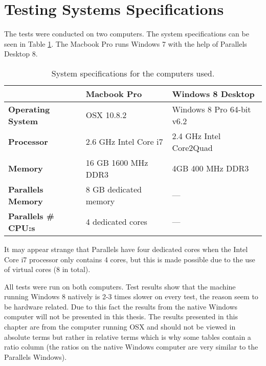 \section{Testing Systems Specifications}
The tests were conducted on two computers. The system specifications can be seen in Table \ref{table:system_specs}. The Macbook Pro runs Windows 7 with the help of Parallels Desktop 8. 

\begin{table}[h]
	\begin{center}
		\begin{tabular} { m{4cm} | m{4cm}  | m{5cm} }
			\hline
			\textbf{} & \textbf{Macbook Pro} & 
			\textbf{Windows 8 Desktop}  \\ \hline

			\textbf{Operating System}		& OSX 10.8.2 
											& Windows 8 Pro 64-bit v6.2 \\ \hline

			\textbf{Processor}				& 2.6 GHz Intel Core i7 
											& 2.4 GHz Intel Core2Quad  \\ \hline

			\textbf{Memory}					& 16 GB 1600 MHz DDR3
											& 4GB 400 MHz DDR3 \\ \hline

			\textbf{Parallels Memory}		& 8 GB dedicated memory 
											& --- \\ \hline

			\textbf{Parallels \# CPU:s} 		& 4 dedicated cores
											& --- \\ \hline
		\end{tabular}
	\end{center}
	\caption{System specifications for the computers used.}
	\label{table:system_specs}
\end{table}
It may appear strange that Parallels have four dedicated cores when the Intel Core i7 processor only contains 4 cores, but this is made possible due to the use of virtual cores (8 in total).

All tests were run on both computers. Test results show that the machine running Windows 8 natively is 2-3 times slower on every test, the reason seem to be hardware related. Due to this fact the results from the native Windows computer will not be presented in this thesis. The results presented in this chapter are from the computer running OSX and should not be viewed in absolute terms but rather in relative terms which is why some tables contain a ratio column (the ratios on the native Windows computer are very similar to the Parallels Windows).



